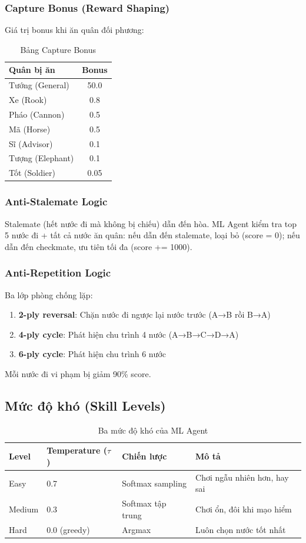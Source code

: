\subsubsection{Capture Bonus (Reward Shaping)}
Giá trị bonus khi ăn quân đối phương:
\begin{table}[H]
\centering
\caption{Bảng Capture Bonus}
\begin{tabular}{lc}
\toprule
\textbf{Quân bị ăn} & \textbf{Bonus} \\
\midrule
Tướng (General) & 50.0 \\
Xe (Rook) & 0.8 \\
Pháo (Cannon) & 0.5 \\
Mã (Horse) & 0.5 \\
Sĩ (Advisor) & 0.1 \\
Tượng (Elephant) & 0.1 \\
Tốt (Soldier) & 0.05 \\
\bottomrule
\end{tabular}
\end{table}

\subsubsection{Anti-Stalemate Logic}
Stalemate (hết nước đi mà không bị chiếu) dẫn đến hòa. ML Agent kiểm tra top 5 nước đi + tất cả nước ăn quân: nếu dẫn đến stalemate, loại bỏ (score = 0); nếu dẫn đến checkmate, ưu tiên tối đa (score += 1000).

\subsubsection{Anti-Repetition Logic}
Ba lớp phòng chống lặp:
\begin{enumerate}
    \item \textbf{2-ply reversal}: Chặn nước đi ngược lại nước trước (A→B rồi B→A)
    \item \textbf{4-ply cycle}: Phát hiện chu trình 4 nước (A→B→C→D→A)
    \item \textbf{6-ply cycle}: Phát hiện chu trình 6 nước
\end{enumerate}
Mỗi nước đi vi phạm bị giảm 90\% score.

\subsection{Mức độ khó (Skill Levels)}
\begin{table}[H]
\centering
\caption{Ba mức độ khó của ML Agent}
\begin{tabular}{llll}
\toprule
\textbf{Level} & \textbf{Temperature ($\tau$)} & \textbf{Chiến lược} & \textbf{Mô tả} \\
\midrule
Easy & 0.7 & Softmax sampling & Chơi ngẫu nhiên hơn, hay sai \\
Medium & 0.3 & Softmax tập trung & Chơi ổn, đôi khi mạo hiểm \\
Hard & 0.0 (greedy) & Argmax & Luôn chọn nước tốt nhất \\
\bottomrule
\end{tabular}
\end{table}
